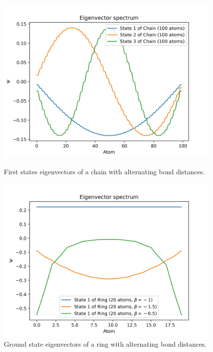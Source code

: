 \documentclass{article}
\begin{document}
\begin{figure}[ht]
    \centering
    \begin{minipage}{0.47\textwidth}
        \centering
        \includegraphics[width=\textwidth]{Figures/beta_chain_eigenvectors.jpg}
        \caption{First states eigenvectors of a chain with alternating bond distances.}
        \label{fig:chain_alternating_beta_vec}
    \end{minipage}
    \hfill
    \begin{minipage}{0.47\textwidth}
        \centering
        \includegraphics[width=\textwidth]{Figures/ring_beta_eigenvectors.jpg}
        \caption{Ground state eigenvectors of a ring with alternating bond distances.}
        \label{fig:ring_alternating_beta_vec}
    \end{minipage}

\end{figure}
\end{document}
